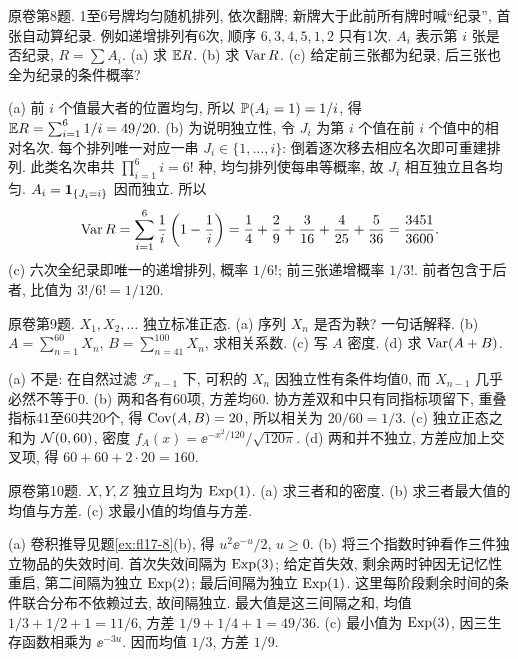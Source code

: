 \begin{exercise}\label{ex:fl18-8}
原卷第8题. 1至6号牌均匀随机排列, 依次翻牌; 新牌大于此前所有牌时喊``纪录'', 首张自动算纪录. 例如递增排列有6次, 顺序 $6,3,4,5,1,2$ 只有1次. $A_i$ 表示第 $i$ 张是否纪录, $R=\sum A_i$. (a) 求 $\mathbb E R$. (b) 求 $\operatorname{Var} R$. (c) 给定前三张都为纪录, 后三张也全为纪录的条件概率?
\end{exercise}
\begin{solution}
(a)\label{sol:fl18-8-a} 前 $i$ 个值最大者的位置均匀, 所以 $\mathbb P(A_i=1)=1/i$, 得 $\mathbb E R=\sum_{i=1}^6 1/i=49/20$.
(b)\label{sol:fl18-8-b} 为说明独立性, 令 $J_i$ 为第 $i$ 个值在前 $i$ 个值中的相对名次. 每个排列唯一对应一串 $J_i\in\{1,\ldots,i\}$: 倒着逐次移去相应名次即可重建排列. 此类名次串共 $\prod_{i=1}^6i=6!$ 种, 均匀排列使每串等概率, 故 $J_i$ 相互独立且各均匀. $A_i=\mathbf 1_{\{J_i=i\}}$ 因而独立. 所以
\[\operatorname{Var} R=\sum_{i=1}^6\frac1i\left(1-\frac1i\right)
=\frac14+\frac29+\frac3{16}+\frac4{25}+\frac5{36}=\frac{3451}{3600}.\]
(c)\label{sol:fl18-8-c} 六次全纪录即唯一的递增排列, 概率 $1/6!$; 前三张递增概率 $1/3!$. 前者包含于后者, 比值为 $3!/6!=1/120$.
\end{solution}

\begin{exercise}\label{ex:fl18-9}
原卷第9题. $X_1,X_2,\ldots$ 独立标准正态. (a) 序列 $X_n$ 是否为鞅? 一句话解释. (b) $A=\sum_{n=1}^{60}X_n$, $B=\sum_{n=41}^{100}X_n$, 求相关系数. (c) 写 $A$ 密度. (d) 求 $\operatorname{Var}(A+B)$.
\end{exercise}
\begin{solution}
(a)\label{sol:fl18-9-a} 不是: 在自然过滤 $\mathcal F_{n-1}$ 下, 可积的 $X_n$ 因独立性有条件均值0, 而 $X_{n-1}$ 几乎必然不等于0.
(b)\label{sol:fl18-9-b} 两和各有60项, 方差均60. 协方差双和中只有同指标项留下, 重叠指标41至60共20个, 得 $\operatorname{Cov}(A,B)=20$, 所以相关为 $20/60=1/3$.
(c)\label{sol:fl18-9-c} 独立正态之和为 $\mathcal N(0,60)$, 密度 $f_A(x)=\ee^{-x^2/120}/\sqrt{120\pi}$.
(d)\label{sol:fl18-9-d} 两和并不独立, 方差应加上交叉项, 得 $60+60+2\cdot20=160$.
\end{solution}

\begin{exercise}\label{ex:fl18-10}
原卷第10题. $X,Y,Z$ 独立且均为 $\operatorname{Exp}(1)$. (a) 求三者和的密度. (b) 求三者最大值的均值与方差. (c) 求最小值的均值与方差.
\end{exercise}
\begin{solution}
(a)\label{sol:fl18-10-a} 卷积推导见题\ref{ex:fl17-8}(b), 得 $u^2\ee^{-u}/2$, $u\geq0$.
(b)\label{sol:fl18-10-b} 将三个指数时钟看作三件独立物品的失效时间. 首次失效间隔为 $\operatorname{Exp}(3)$; 给定首失效, 剩余两时钟因无记忆性重启, 第二间隔为独立 $\operatorname{Exp}(2)$; 最后间隔为独立 $\operatorname{Exp}(1)$. 这里每阶段剩余时间的条件联合分布不依赖过去, 故间隔独立. 最大值是这三间隔之和, 均值 $1/3+1/2+1=11/6$, 方差 $1/9+1/4+1=49/36$.
(c)\label{sol:fl18-10-c} 最小值为 $\operatorname{Exp}(3)$, 因三生存函数相乘为 $\ee^{-3u}$. 因而均值 $1/3$, 方差 $1/9$.
\end{solution}

